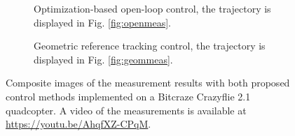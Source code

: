 \begin{figure}
\setlength{\fboxsep}{0pt}%
\setlength{\fboxrule}{1pt}
\centering
\begin{subfigure}{.45\textwidth}
  \centering
  \caption{Optimization-based open-loop control, the trajectory is displayed in Fig. \ref{fig:openmeas}.}
  \label{fig:sub1}
\end{subfigure}%
\hspace{1cm}
\begin{subfigure}{.45\textwidth}
  \centering
  \caption{Geometric reference tracking control, the trajectory is displayed in Fig. \ref{fig:geommeas}.}
  \label{fig:sub2}
\end{subfigure}
\caption[Composite images of the measurement results]{Composite images of the measurement results with both proposed control methods implemented on a Bitcraze Crazyflie 2.1 quadcopter. A video of the measurements is available at \url{https://youtu.be/AhqfXZ-CPqM}.}
\label{fig:test}
\end{figure}

